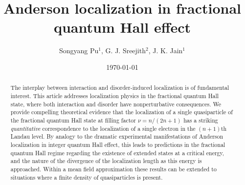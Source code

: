 \documentclass[twocolumn,floatfix,prb,aps,showpacs]{revtex4-2}
\begin{document}
\title{Anderson localization in fractional quantum Hall effect}
\author{Songyang Pu$^1$, G. J. Sreejith$^2$, J. K. Jain$^1$}
\date{\today}
\begin{abstract} 
The interplay between interaction and disorder-induced localization is of fundamental interest. This article addresses localization physics in the 
fractional quantum Hall state, where 
both interaction and disorder have nonperturbative consequences. We provide compelling theoretical evidence that the localization of a single quasiparticle of the fractional quantum Hall state at filling factor $\nu=n/(2n+1)$  has a striking {\it quantitative} correspondence to the localization of a single electron in the $(n+1)$th Landau level. By analogy to the dramatic experimental manifestations of Anderson localization in integer quantum Hall effect, this leads to predictions in the fractional quantum Hall regime regarding the existence of extended states at a critical energy, and the nature of the divergence of the localization length as this energy is approached. Within a mean field approximation these results can be extended to situations where a finite density of quasiparticles is present.
\end{abstract}
\maketitle
\end{document}
